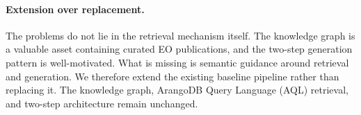 \paragraph{Extension over replacement.} The problems do not lie in the retrieval mechanism itself. The knowledge graph is a valuable asset containing curated EO publications, and the two-step generation pattern is well-motivated. What is missing is semantic guidance around retrieval and generation. We therefore extend the existing baseline pipeline rather than replacing it. The knowledge graph, ArangoDB Query Language (AQL) retrieval, and two-step architecture remain unchanged.
